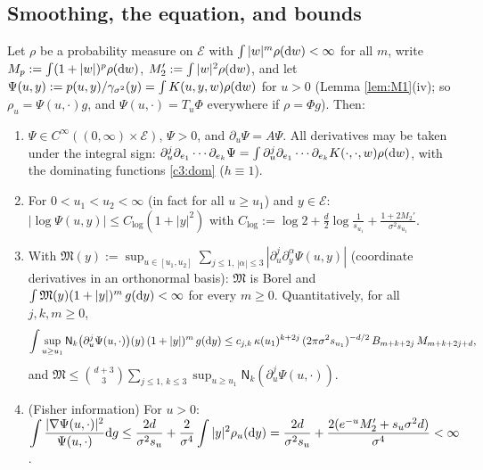 \subsection{Smoothing, the equation, and bounds}\label{c3:ss:M2}

\begin{lemma}\label{lem:M2}
Let $\rho$ be a probability measure on $\mathcal E$ with $\int|w|^m\rho(\mathrm{d} w)<\infty$ for all $m$, write $M_p:=\int(1+|w|)^p\rho(\mathrm{d} w)$, $M_2':=\int|w|^2\rho(\mathrm{d} w)$, and let $\Psi(u,y):=p(u,y)/\gamma_{\sigma^2}(y)=\int K(u,y,w)\rho(\mathrm{d} w)$ for $u>0$ (Lemma \ref{lem:M1}(iv); so $\rho_u=\Psi(u,\cdot)g$, and $\Psi(u,\cdot)=T_u\Phi$ everywhere if $\rho=\Phi g$). Then:
\begin{enumerate}[label=(\roman*),itemsep=1pt]
\item $\Psi\in C^\infty((0,\infty)\times\mathcal E)$, $\Psi>0$, and $\partial_u\Psi=A\Psi$. All derivatives may be taken under the integral sign: $\partial_u^j\partial_{e_1}\cdots\partial_{e_k}\Psi=\int\partial_u^j\partial_{e_1}\cdots\partial_{e_k}K(\cdot,\cdot,w)\rho(\mathrm{d} w)$, with the dominating functions \eqref{c3:dom} ($h\equiv1$).
\item For $0<u_1<u_2<\infty$ (in fact for all $u\ge u_1$) and $y\in\mathcal E$: $|\log\Psi(u,y)|\le C_{\log}(1+|y|^2)$ with
$C_{\log}:=\log2+\frac d2\log\frac1{s_{u_1}}+\frac{1+2M_2'}{\sigma^2s_{u_1}}$.
\item With $\mathfrak M(y):=\sup_{u\in[u_1,u_2]}\sum_{j\le1,\,|\alpha|\le3}|\partial_u^j\partial_y^\alpha\Psi(u,y)|$ (coordinate derivatives in an orthonormal basis): $\mathfrak M$ is Borel and $\int\mathfrak M(y)(1+|y|)^m\,g(\mathrm{d} y)<\infty$ for every $m\ge0$. Quantitatively, for all $j,k,m\ge0$,
\begin{equation}\label{c3:Mbound}
\int\sup_{u\ge u_1}\mathsf N_k\big(\partial_u^j\Psi(u,\cdot)\big)(y)\,(1+|y|)^m\,g(\mathrm{d} y)\le c_{j,k}\,\kappa(u_1)^{k+2j}\,(2\pi\sigma^2s_{u_1})^{-d/2}\,B_{m+k+2j}\,M_{m+k+2j+d},
\end{equation}
and $\mathfrak M\le\binom{d+3}{3}\sum_{j\le1,\,k\le3}\sup_{u\ge u_1}\mathsf N_k(\partial_u^j\Psi(u,\cdot))$.
\item (Fisher information) For $u>0$: $\displaystyle\int\frac{|\nabla\Psi(u,\cdot)|^2}{\Psi(u,\cdot)}\mathrm{d} g\le\frac{2d}{\sigma^2s_u}+\frac{2}{\sigma^4}\int|y|^2\rho_u(\mathrm{d} y)=\frac{2d}{\sigma^2s_u}+\frac{2(e^{-u}M_2'+s_u\sigma^2d)}{\sigma^4}<\infty$.
\end{enumerate}
\end{lemma}

